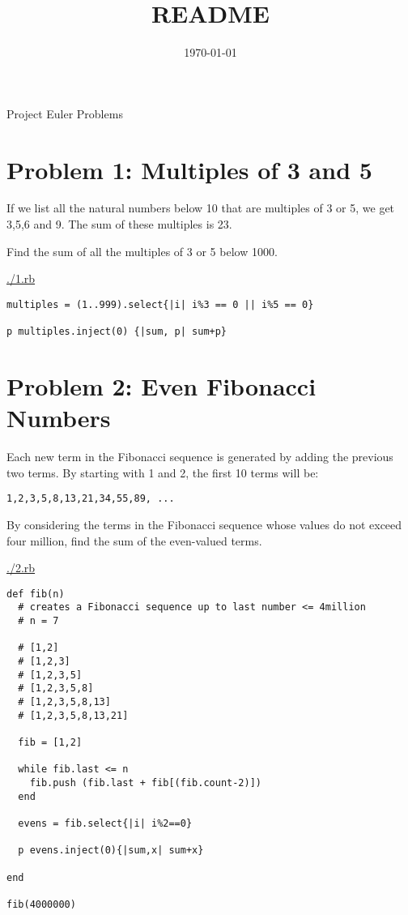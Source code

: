 \documentclass[11pt]{article}
\date{\today}
\title{README}
\begin{document}
\maketitle
\tableofcontents

Project Euler Problems

\section{Problem 1: Multiples of 3 and 5}
\label{sec-1}

If we list all the natural numbers below 10 that are multiples of 3 or 5, we 
get 3,5,6 and 9. The sum of these multiples is 23.

Find the sum of all the multiples of 3 or 5 below 1000.

\url{./1.rb}

\begin{verbatim}
multiples = (1..999).select{|i| i%3 == 0 || i%5 == 0}

p multiples.inject(0) {|sum, p| sum+p}
\end{verbatim}



\section{Problem 2: Even Fibonacci Numbers}
\label{sec-2}

Each new term in the Fibonacci sequence is generated by adding the previous 
two terms. By starting with 1 and 2, the first 10 terms will be:

\begin{verbatim}
1,2,3,5,8,13,21,34,55,89, ...
\end{verbatim}

By considering the terms in the Fibonacci sequence whose values do not exceed 
four million, find the sum of the even-valued terms.

\url{./2.rb}

\begin{verbatim}
def fib(n)
  # creates a Fibonacci sequence up to last number <= 4million
  # n = 7

  # [1,2]
  # [1,2,3]
  # [1,2,3,5]
  # [1,2,3,5,8]
  # [1,2,3,5,8,13]
  # [1,2,3,5,8,13,21]

  fib = [1,2]

  while fib.last <= n
    fib.push (fib.last + fib[(fib.count-2)])
  end

  evens = fib.select{|i| i%2==0}

  p evens.inject(0){|sum,x| sum+x}

end

fib(4000000)
\end{verbatim}
\end{document}
